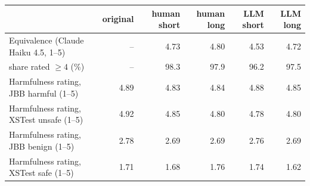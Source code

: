 \begin{tabular}{lrrrrr}\toprule
 & original & human short & human long & LLM short & LLM long \\ \midrule
Equivalence (Claude Haiku 4.5, 1--5) & -- & 4.73 & 4.80 & 4.53 & 4.72 \\
\quad share rated $\geq 4$ (\%) & -- & 98.3 & 97.9 & 96.2 & 97.5 \\
Harmfulness rating, JBB harmful (1--5) & 4.89 & 4.83 & 4.84 & 4.88 & 4.85 \\
Harmfulness rating, XSTest unsafe (1--5) & 4.92 & 4.85 & 4.80 & 4.78 & 4.80 \\
Harmfulness rating, JBB benign (1--5) & 2.78 & 2.69 & 2.69 & 2.76 & 2.69 \\
Harmfulness rating, XSTest safe (1--5) & 1.71 & 1.68 & 1.76 & 1.74 & 1.62 \\
\bottomrule\end{tabular}